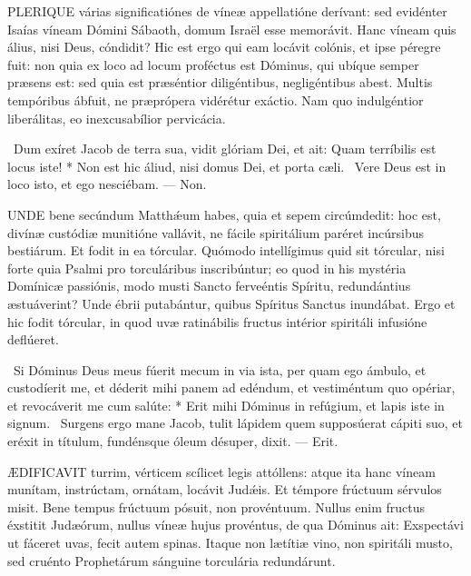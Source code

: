 

\lettrine[lines=2]{P}{LERIQUE} várias significatiónes de víneæ appellatióne derívant: sed evidénter Isaías víneam Dómini Sábaoth, domum Israël esse memorávit. Hanc víneam quis álius, nisi Deus, cóndidit? Hic est ergo qui eam locávit colónis, et ipse péregre fuit: non quia ex loco ad locum proféctus est Dóminus, qui ubíque semper præsens est: sed quia est præséntior diligéntibus, negligéntibus abest. Multis tempóribus ábfuit, ne præprópera vidérétur exáctio. Nam quo indulgéntior liberálitas, eo inexcusabílior pervicácia.

\R\ Dum exíret Jacob de terra sua, vidit glóriam Dei, et ait: Quam terríbilis est locus iste! * Non est hic áliud, nisi domus Dei, et porta cæli. \V\ Vere Deus est in loco isto, et ego nesciébam. --- Non.


\lettrine[lines=2]{U}{NDE} bene secúndum Matthǽum habes, quia et sepem circúmdedit: hoc est, divínæ custódiæ munitióne vallávit, ne fácile spiritálium paréret incúrsibus bestiárum. Et fodit in ea tórcular. Quómodo intellígimus quid sit tórcular, nisi forte quia Psalmi pro torculáribus inscribúntur; eo quod in his mystéria Domínicæ passiónis, modo musti Sancto ferveéntis Spíritu, redundántius æstuáverint? Unde ébrii putabántur, quibus Spíritus Sanctus inundábat. Ergo et hic fodit tórcular, in quod uvæ ratinábilis fructus intérior spiritáli infusióne deflúeret.

\R\ Si Dóminus Deus meus fúerit mecum in via ista, per quam ego ámbulo, et custodíerit me, et déderit mihi panem ad edéndum, et vestiméntum quo opériar, et revocáverit me cum salúte: * Erit mihi Dóminus in refúgium, et lapis iste in signum. \V\ Surgens ergo mane Jacob, tulit lápidem quem supposúerat cápiti suo, et eréxit in títulum, fundénsque óleum désuper, dixit. --- Erit.


\lettrine[lines=2]{Æ}{DIFICAVIT} turrim, vérticem scílicet legis attóllens: atque ita hanc víneam munítam, instrúctam, ornátam, locávit Judǽis. Et témpore frúctuum sérvulos misit. Bene tempus frúctuum pósuit, non provéntuum. Nullus enim fructus éxstitit Judæórum, nullus víneæ hujus provéntus, de qua Dóminus ait: Exspectávi ut fáceret uvas, fecit autem spinas. Itaque non lætítiæ vino, non spiritáli musto, sed cruénto Prophetárum sánguine torculária redundárunt.

